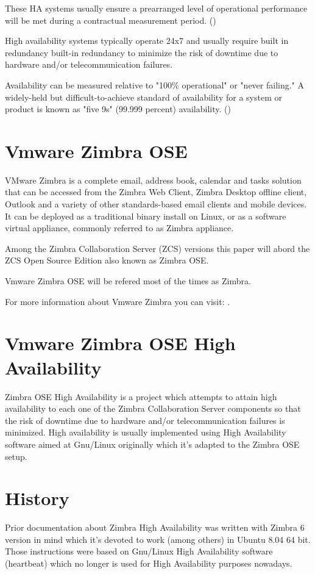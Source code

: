 These HA systems usually ensure a prearranged level of operational performance will be met during a contractual measurement period. (\cite{WikipediaHA})

High availability systems typically operate 24x7 and usually require built in redundancy built-in redundancy to minimize the risk of downtime due to hardware and/or telecommunication failures. 

Availability can be measured relative to "100\% operational" or "never failing." A widely-held but difficult-to-achieve standard of availability for a system or product is known as "five 9s" (99.999 percent) availability. (\cite{BCMHA})


\section {Vmware Zimbra OSE}
VMware Zimbra is a complete email, address book, calendar and tasks solution that can be accessed from the Zimbra Web Client, Zimbra Desktop offline client, Outlook and a variety of other standards-based email clients and mobile devices. It can be deployed as a traditional binary install on Linux, or as a software virtual appliance, commonly referred to as Zimbra appliance.

Among the Zimbra Collaboration Server (ZCS) versions this paper will abord the ZCS Open Source Edition also known as Zimbra OSE.

Vmware Zimbra OSE will be refered most of the times as Zimbra.

For more information about Vmware Zimbra you can visit: \cite{ZimbraLearn}.

\section {Vmware Zimbra OSE High Availability}
Zimbra OSE High Availability is a project which attempts to attain high availability to each one of the Zimbra Collaboration Server components so that the risk of downtime due to hardware and/or telecommunication failures is minimized. High availability is usually implemented using High Availability software aimed at Gnu/Linux originally which it's adapted to the Zimbra OSE setup.


\section{History}

Prior documentation about Zimbra High Availability was written with Zimbra 6 version in mind which it's devoted to work (among others) in Ubuntu 8.04 64 bit. Those instructions were based on Gnu/Linux High Availability software (heartbeat) which no longer is used for High Availability purposes nowadays.

